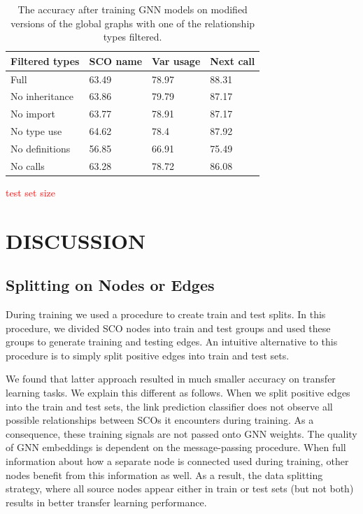 \documentclass[a4paper,twoside]{article}
\begin{document}
\begin{table}[]
\centering
\begin{tabular}{p{1.8cm}p{1.3cm}p{1.4cm}p{1.32cm}}
\toprule
\textbf{Filtered types} & \textbf{SCO name} & \textbf{Var usage} & \textbf{Next call} \\\midrule
Full                         & 63.49             & 78.97              & 88.31              \\\midrule
No inheritance              & 63.86             & 79.79              & 87.17              \\\midrule
No import                    & 63.77             & 78.91              & 87.17              \\\midrule
No type use                  & 64.62             & 78.4               & 87.92              \\\midrule
No definitions            & 56.85             & 66.91              & 75.49              \\\midrule
No calls                     & 63.28             & 78.72              & 86.08    \\         \bottomrule
\end{tabular}
\caption{The accuracy after training GNN models on modified versions of the global graphs with one of the relationship types filtered.}
\label{tbl:ablation}
\end{table}

\textcolor{red}{test set size}

\section{\uppercase{Discussion}}\label{sec:discuss}

\subsection{Splitting on Nodes or Edges}

During training we used a procedure to create train and test splits. In this procedure, we divided SCO nodes into train and test groups and used these groups to generate training and testing edges. An intuitive alternative to this procedure is to simply split positive edges into train and test sets.

We found that latter approach resulted in much smaller accuracy on transfer learning tasks. We explain this different as follows. When we split positive edges into the train and test sets, the link prediction classifier does not observe all possible relationships between SCOs it encounters during training. As a consequence, these training signals are not passed onto GNN weights. The quality of GNN embeddings is dependent on the message-passing procedure. When full information about how a separate node is connected used during training, other nodes benefit from this information as well. As a result, the data splitting strategy, where all source nodes appear either in train or test sets (but not both) results in better transfer learning performance. 
\end{document}
